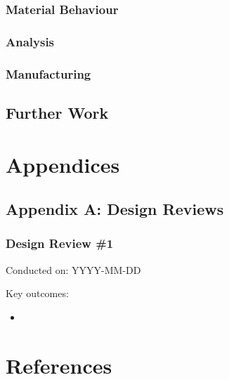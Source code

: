\documentclass[10pt]{article}
\begin{document}
\subsubsection{Material Behaviour}

\subsubsection{Analysis}

\subsubsection{Manufacturing}

\subsection{Further Work}

\section{Appendices}

\subsection{Appendix A: Design Reviews} %

\subsubsection{Design Review \#1}
Conducted on: YYYY-MM-DD

Key outcomes:
\begin{itemize}[leftmargin=*]
	\item %
\end{itemize}

\section{References}
\printbibliography[heading=none] %

\end{document}
